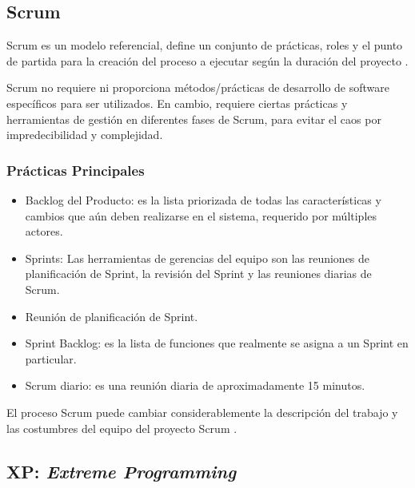 \subsection{Scrum}

\par Scrum es un modelo referencial, define un conjunto de prácticas, roles y el punto de partida para la creación del proceso a ejecutar según la duración del proyecto \cite{BOOK11}. \\

\par Scrum no requiere ni proporciona métodos/prácticas de desarrollo de software específicos para ser utilizados. En cambio, requiere ciertas prácticas y herramientas de gestión en diferentes fases de Scrum, para evitar el caos por impredecibilidad y complejidad.
\subsubsection{Prácticas Principales}
\begin{itemize}
    \item Backlog del Producto: es la lista priorizada de todas las características y cambios que aún deben realizarse en el sistema, requerido por múltiples actores.
    \item Sprints: Las herramientas de gerencias del equipo son las reuniones de planificación de Sprint, la revisión del Sprint y las reuniones diarias de Scrum.
    \item Reunión de planificación de Sprint.
    \item Sprint Backlog: es la lista de funciones que realmente se asigna a un Sprint en particular. 
    \item Scrum diario: es una reunión diaria de aproximadamente 15 minutos. 
\end{itemize}

\par El proceso Scrum puede cambiar considerablemente la descripción del trabajo y las costumbres del equipo del proyecto Scrum \cite{BOOK08,BOOK11}.

\subsection{XP: \textit{Extreme Programming}}

